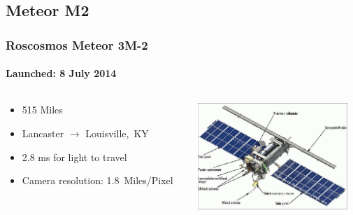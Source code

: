 \documentclass[]{beamer}
\begin{document}
\subsection{Meteor M2}
\begin{frame}
    \frametitle{Roscosmos Meteor 3M-2}
    \framesubtitle{Launched: 8 July 2014}
    \begin{columns}[T]
        \begin{column}[T]{5.5cm}
            \begin{itemize}
                \item 515 Miles
                \item Lancaster $\to$ Louisville,~KY
                \item 2.8 ms for light to travel
                \item Camera resolution: 1.8~Miles/Pixel
            \end{itemize}
        \end{column}
        \begin{column}[T]{5cm}
            \includegraphics[height=4cm,keepaspectratio]{images/meteor-m2.jpg}
        \end{column}
    \end{columns}
\end{frame}
\end{document}
